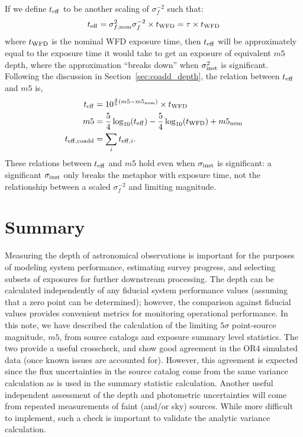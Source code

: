 \documentclass[DM,authoryear,toc]{lsstdoc}
\begin{document}
If we define $t_{\rm eff}$ to be another scaling of $\sigma_f^{-2}$ such that:
\begin{equation}
t_{\rm eff} = \sigma_{f, {\rm nom}}^2 \sigma_f^{-2} \times t_{\rm WFD} = \tau \times t_{\rm WFD} 
\end{equation}
where $t_{\rm WFD}$ is the nominal WFD exposure time, then $t_{\rm eff}$ will be approximately equal to the exposure time it would take to get an exposure of equivalent $m5$ depth, where the approximation ``breaks down'' when $\sigma_{\rm inst}^2$ is significant.
Following the discussion in Section~\ref{sec:coadd_depth}, the relation between $t_{\rm eff}$ and $m5$ is,
\begin{align}
t_{\rm eff} &= 10^{\frac{4}{5} (m5 - m5_{\rm nom})} \times t_{\rm WFD}  \\
m5 &= \frac{5}{4} \log_{10}(t_{\rm eff}) - \frac{5}{4} \log_{10}(t_{\rm WFD}) + m5_{\rm nom} \\
t_{\rm eff, coadd} &= \sum_i t_{{\rm eff},i}.
\end{align}
These relations between $t_{\rm eff}$ and $m5$ hold even when $\sigma_{\rm inst}$ is significant: a significant $\sigma_{\rm inst}$ only breaks the metaphor with exposure time, not the relationship between a scaled $\sigma_f^{-2}$ and limiting magnitude.

\section{Summary}
\label{sec:summary}
Measuring the depth of astronomical observations is important for the purposes of modeling system performance, estimating survey progress, and selecting subsets of exposures for further downstream processing. The depth can be calculated independently of any fiducial system performance values (assuming that a zero point can be determined); however, the comparison against fiducial values provides convenient metrics for monitoring operational performance. In this note, we have described the calculation of the limiting $5\sigma$ point-source magnitude, $m5$, from source catalogs and exposure summary level statistics. The two provide a useful crosscheck, and show good agreement in the OR4 simulated data (once known issues are accounted for). However, this agreement is expected since the flux uncertainties in the source catalog come from the same variance calculation as is used in the summary statistic calculation. Another useful independent assessment of the depth and photometric uncertainties will come from repeated measurements of faint (and/or sky) sources. While more difficult to implement, such a check is important to validate the analytic variance calculation.
\end{document}
